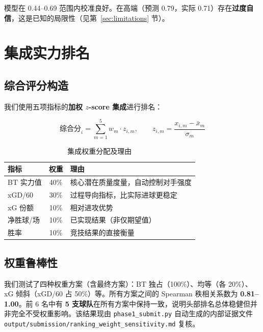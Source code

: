 \documentclass[11pt, a4paper]{article}
\begin{document}
\noindent 模型在 0.44--0.69 范围内校准良好。在高端（预测 0.79，实际 0.71）存在\textbf{过度自信}，这是已知的局限性（见第~\ref{sec:limitations} 节）。

\section{集成实力排名}
\label{sec:rankings}

\subsection{综合评分构造}

我们使用五项指标的\textbf{加权 $z$-score 集成}进行排名：

\begin{equation}
\text{综合分}_i = \sum_{m=1}^{5} w_m \cdot z_{i,m}, \qquad
z_{i,m} = \frac{x_{i,m} - \bar{x}_m}{\sigma_m}
\label{eq:composite}
\end{equation}

\begin{table}[H]
\centering
\caption{集成权重分配及理由}
\label{tab:weights}
\begin{tabular}{lcl}
\toprule
\textbf{指标} & \textbf{权重} & \textbf{理由} \\
\midrule
BT 实力值 & 40\% & 核心潜在质量度量，自动控制对手强度 \\
xGD/60 & 30\% & 过程导向指标，比实际进球更稳定 \\
xG 份额 & 10\% & 相对进攻优势 \\
净胜球/场 & 10\% & 已实现结果（非仅期望值） \\
胜率 & 10\% & 竞技结果的直接衡量 \\
\bottomrule
\end{tabular}
\end{table}

\subsection{权重鲁棒性}

我们测试了四种权重方案（含最终方案）：BT 独占（100\%）、均等（各 20\%）、xG 倾斜（xGD/60 占 50\%）等。所有方案之间的 Spearman 秩相关系数为 \textbf{0.81--1.00}。前 6 名中有 \textbf{5 支球队}在所有方案中保持一致，说明头部排名总体稳健但并非完全不受权重影响。该结果现由 \texttt{phase1\_submit.py} 自动生成的内部证据文件 \texttt{output/submission/ranking\_weight\_sensitivity.md} 复核。
\end{document}
